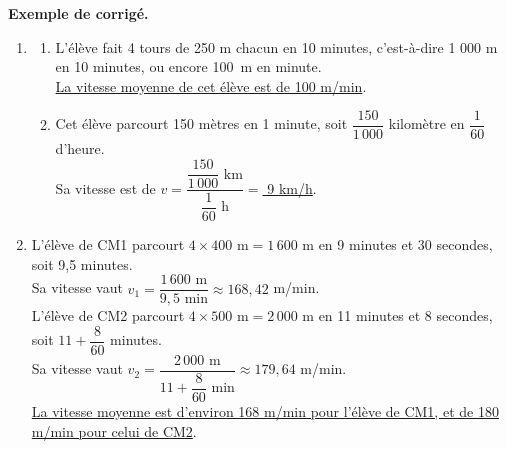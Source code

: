 \begin{activite}
   \textcolor{G1}{
   {\bf Exemple de corrigé.} \smallskip
      \begin{enumerate}
         \item
            \begin{enumerate}
               \item L'élève fait 4 tours de 250 m chacun en 10 minutes, c'est-à-dire 1 000 m en 10 minutes, ou encore 100~m en minute. \\
            \uline{La vitesse moyenne de cet élève est de 100 m/min}. \smallskip
               \item Cet élève parcourt 150 mètres en 1 minute, soit $\dfrac{150}{1\,000}$ kilomètre en $\dfrac{1}{60}$ d'heure. \\
               Sa vitesse est de $v =\dfrac{\dfrac{150}{1\,000}\text{ km}}{\dfrac{1}{60}\text{ h}} =$\uline{ 9 km/h}. \smallskip
            \end{enumerate}
         \item L'élève de CM1 parcourt $4\times400\text{ m} =1\,600\text{ m}$ en 9 minutes et 30 secondes, soit 9,5 minutes. \\ [1mm]
         Sa vitesse vaut $v_1 =\dfrac{1\,600\text{ m}}{9,5\text{ min}} \approx 168,42$ m/min. \\
         L'élève de CM2 parcourt $4\times500\text{ m} =2\,000\text{ m}$ en 11 minutes et 8 secondes, soit $11+\dfrac{8}{60}$ minutes. \\ [1mm]
         Sa vitesse vaut $v_2 =\dfrac{2\,000\text{ m}}{11+\dfrac{8}{60}\text{ min}} \approx 179,64$ m/min. \\ [1mm]
         \uline{La vitesse moyenne est d'environ 168 m/min pour l'élève de CM1, et de 180 m/min pour celui de CM2}.
      \end{enumerate}}
\end{activite}

\vfill



